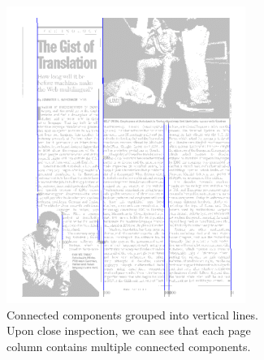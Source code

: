\begin{figure}[p]
\begin{subfigure}{0.30\textwidth}
\includegraphics[width=\linewidth]{img/tabStopDetection/tessPageSegm2.png}
\caption{Connected components grouped into vertical lines. Upon close inspection, we can see that each page column contains multiple connected components.}
\label{fig:segmentationTesseract2}
\end{subfigure}
\quad
\begin{subfigure}{0.30\textwidth}

\end{subfigure}
\end{figure}
